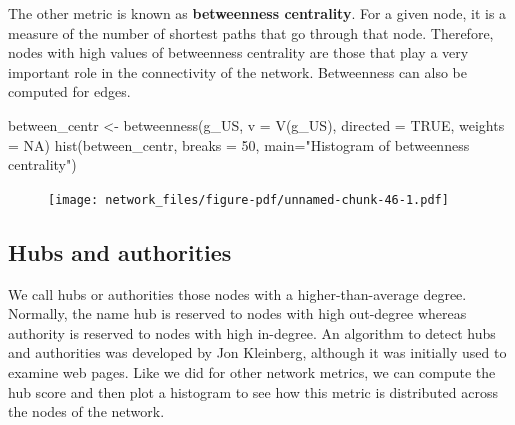 \documentclass[
  letterpaper,
  DIV=11,
  numbers=noendperiod]{scrreprt}
\newenvironment{Shaded}{\begin{snugshade}}{\end{snugshade}}
\newcommand{\AttributeTok}[1]{\textcolor[rgb]{0.40,0.45,0.13}{#1}}
\newcommand{\CommentTok}[1]{\textcolor[rgb]{0.37,0.37,0.37}{#1}}
\newcommand{\ConstantTok}[1]{\textcolor[rgb]{0.56,0.35,0.01}{#1}}
\newcommand{\DecValTok}[1]{\textcolor[rgb]{0.68,0.00,0.00}{#1}}
\newcommand{\FunctionTok}[1]{\textcolor[rgb]{0.28,0.35,0.67}{#1}}
\newcommand{\NormalTok}[1]{\textcolor[rgb]{0.00,0.23,0.31}{#1}}
\newcommand{\OtherTok}[1]{\textcolor[rgb]{0.00,0.23,0.31}{#1}}
\newcommand{\SpecialCharTok}[1]{\textcolor[rgb]{0.37,0.37,0.37}{#1}}
\newcommand{\StringTok}[1]{\textcolor[rgb]{0.13,0.47,0.30}{#1}}
\begin{document}
The other metric is known as \textbf{betweenness centrality}. For a
given node, it is a measure of the number of shortest paths that go
through that node. Therefore, nodes with high values of betweenness
centrality are those that play a very important role in the connectivity
of the network. Betweenness can also be computed for edges.

\begin{Shaded}
\begin{Highlighting}[]
\NormalTok{between\_centr }\OtherTok{\textless{}{-}} \FunctionTok{betweenness}\NormalTok{(g\_US, }\AttributeTok{v =} \FunctionTok{V}\NormalTok{(g\_US), }\AttributeTok{directed =} \ConstantTok{TRUE}\NormalTok{, }\AttributeTok{weights =} \ConstantTok{NA}\NormalTok{)}
\FunctionTok{hist}\NormalTok{(between\_centr, }\AttributeTok{breaks =} \DecValTok{50}\NormalTok{, }\AttributeTok{main=}\StringTok{"Histogram of betweenness centrality"}\NormalTok{)}
\end{Highlighting}
\end{Shaded}

\begin{figure}[H]

{\centering \texttt{[image: network\_files/figure-pdf/unnamed-chunk-46-1.pdf]}

}

\end{figure}

\hypertarget{hubs-and-authorities}{%
\subsection{Hubs and authorities}\label{hubs-and-authorities}}

We call hubs or authorities those nodes with a higher-than-average
degree. Normally, the name hub is reserved to nodes with high out-degree
whereas authority is reserved to nodes with high in-degree. An algorithm
to detect hubs and authorities was developed by Jon Kleinberg, although
it was initially used to examine web pages. Like we did for other
network metrics, we can compute the hub score and then plot a histogram
to see how this metric is distributed across the nodes of the network.

\begin{Shaded}
\end{Shaded}
\end{document}
